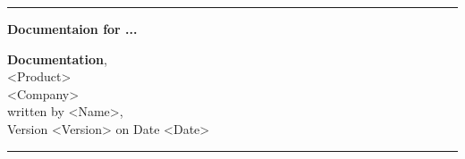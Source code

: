 \begin{titlepage}
\thispagestyle{empty}
    \hrule
    \vspace{1cm}
    \begin{center}
        {\huge\bf\sc Documentaion for ...}
    \end{center}
    \vfill
    \begin{Large}
        {\bf Documentation},\\[48pt]
        <Product>\\
        <Company>\\[72pt]
        written by <Name>,\\
        Version <Version> on Date <Date>
        \vfill
        \noindent{\today}
    \end{Large}
    \vspace{1cm}
    \hrule
\end{titlepage}



